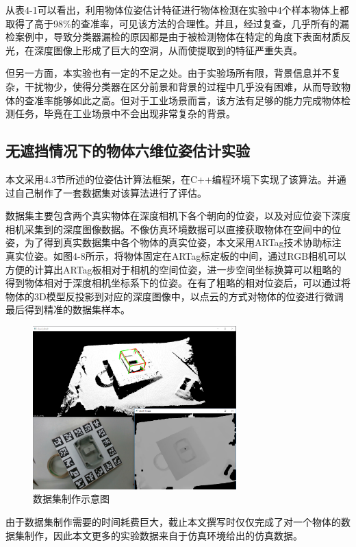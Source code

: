 从表4-1可以看出，利用物体位姿估计特征进行物体检测在实验中4个样本物体上都取得了高于98\%的查准率，可见该方法的合理性。并且，经过复查，几乎所有的漏检案例中，导致分类器漏检的原因都是由于被检测物体在特定的角度下表面材质反光，在深度图像上形成了巨大的空洞，从而使提取到的特征严重失真。

但另一方面，本实验也有一定的不足之处。由于实验场所有限，背景信息并不复杂，干扰物少，使得分类器在区分前景和背景的过程中几乎没有困难，从而导致物体的查准率能够如此之高。但对于工业场景而言，该方法有足够的能力完成物体检测任务，毕竟在工业场景中不会出现非常复杂的背景。

\subsection{无遮挡情况下的物体六维位姿估计实验}

本文采用4.3节所述的位姿估计算法框架，在C++编程环境下实现了该算法。并通过自己制作了一套数据集对该算法进行了评估。

数据集主要包含两个真实物体在深度相机下各个朝向的位姿，以及对应位姿下深度相机采集到的深度图像数据。不像仿真环境数据可以直接获取物体在空间中的位姿，为了得到真实数据集中各个物体的真实位姿，本文采用ARTag技术协助标注真实位姿。如图4-8所示，将物体固定在ARTag标定板的中间，通过RGB相机可以方便的计算出ARTag板相对于相机的空间位姿，进一步空间坐标换算可以粗略的得到物体相对于深度相机坐标系下的位姿。在有了粗略的相对位姿后，可以通过将物体的3D模型反投影到对应的深度图像中，以点云的方式对物体的位姿进行微调最后得到精准的数据集样本。
\begin{figure}[htb]
	\centering 
	\includegraphics[width=0.7\textwidth]{./mypic/数据集制作.png} 
	\caption{数据集制作示意图} 
\end{figure}

由于数据集制作需要的时间耗费巨大，截止本文撰写时仅仅完成了对一个物体的数据集制作，因此本文更多的实验数据来自于仿真环境给出的仿真数据。

